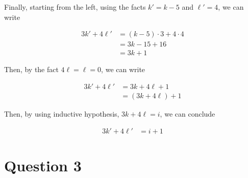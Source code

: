 \documentclass[12pt]{article}
\begin{document}
\begin{itemize}
\begin{mdframed}
\begin{enumerate}[1.]
\begin{enumerate}[1.]
\begin{mdframed}
                \bigskip

                Finally, starting from the left, using the facts $k' = k - 5$ and $\ell' = 4$, we can write

                \begin{align}
                3k' + 4\ell' &= (k-5) \cdot 3 + 4 \cdot 4\\
                &= 3k - 15 + 16\\
                &= 3k + 1
                \end{align}

                \bigskip

                Then, by the fact $4\ell = \ell = 0$, we can write

                \begin{align}
                3k' + 4\ell' &= 3k + 4\ell + 1\\
                &= (3k + 4\ell) + 1
                \end{align}

                \bigskip

                Then, by using inductive hypothesis, $3k + 4\ell = i$, we can conclude

                \begin{align}
                3k' + 4\ell' &= i + 1
                \end{align}

                \end{mdframed}
            \end{enumerate}
        \end{enumerate}
    \end{mdframed}
\end{itemize}

\section*{Question 3}
\end{document}
